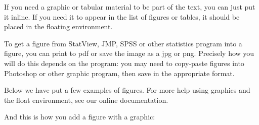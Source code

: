 \documentclass[12pt,twoside]{reedthesis}
\begin{document}
	If you need a graphic or tabular material to be part of the text, you can just put it inline. If you need it to appear in the list of figures or tables, it should be placed in the floating environment. 
	
	To get a figure from StatView, JMP, SPSS or other statistics program into a figure, you can print to pdf or save the image as a jpg or png. Precisely how you will do this depends on the program: you may need to copy-paste figures into Photoshop or other graphic program, then save in the appropriate format.
	
	Below we have put a few examples of figures. For more help using graphics and the float environment, see our online documentation.
	
	And this is how you add a figure with a graphic:
%	   

\clearpage %

%	   
\end{document}
